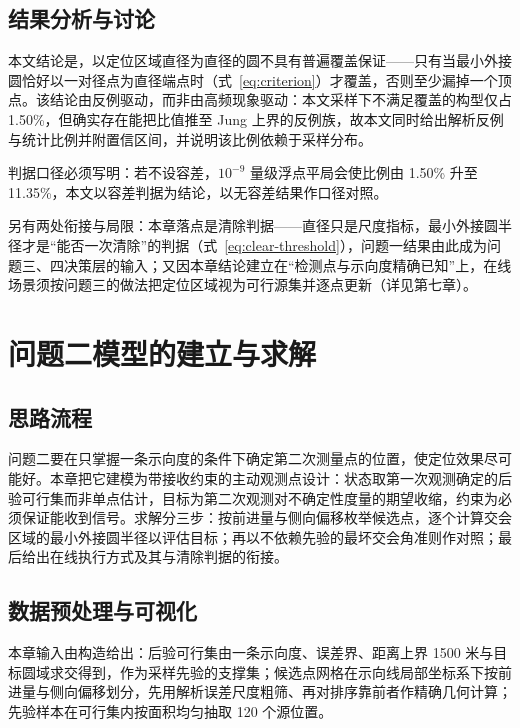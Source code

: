 \documentclass[12pt,a4paper]{ctexart}
\begin{document}
\subsection{结果分析与讨论}

本文结论是，以定位区域直径为直径的圆不具有普遍覆盖保证——只有当最小外接圆恰好以一对径点为直径端点时（式~\eqref{eq:criterion}）才覆盖，否则至少漏掉一个顶点。该结论由反例驱动，而非由高频现象驱动：本文采样下不满足覆盖的构型仅占 1.50\%，但确实存在能把比值推至 Jung 上界的反例族，故本文同时给出解析反例与统计比例并附置信区间，并说明该比例依赖于采样分布。

判据口径必须写明：若不设容差，$10^{-9}$ 量级浮点平局会使比例由 1.50\% 升至 11.35\%，本文以容差判据为结论，以无容差结果作口径对照。


另有两处衔接与局限：本章落点是清除判据——直径只是尺度指标，最小外接圆半径才是“能否一次清除”的判据（式~\eqref{eq:clear-threshold}），问题一结果由此成为问题三、四决策层的输入；又因本章结论建立在“检测点与示向度精确已知”上，在线场景须按问题三的做法把定位区域视为可行源集并逐点更新（详见第七章）。

\FloatBarrier

\section{问题二模型的建立与求解}

\subsection{思路流程}

问题二要在只掌握一条示向度的条件下确定第二次测量点的位置，使定位效果尽可能好。本章把它建模为带接收约束的主动观测点设计：状态取第一次观测确定的后验可行集而非单点估计，目标为第二次观测对不确定性度量的期望收缩，约束为必须保证能收到信号。求解分三步：按前进量与侧向偏移枚举候选点，逐个计算交会区域的最小外接圆半径以评估目标；再以不依赖先验的最坏交会角准则作对照；最后给出在线执行方式及其与清除判据的衔接。


\subsection{数据预处理与可视化}

本章输入由构造给出：后验可行集由一条示向度、误差界、距离上界 1500 米与目标圆域求交得到，作为采样先验的支撑集；候选点网格在示向线局部坐标系下按前进量与侧向偏移划分，先用解析误差尺度粗筛、再对排序靠前者作精确几何计算；先验样本在可行集内按面积均匀抽取 120 个源位置。
\end{document}
